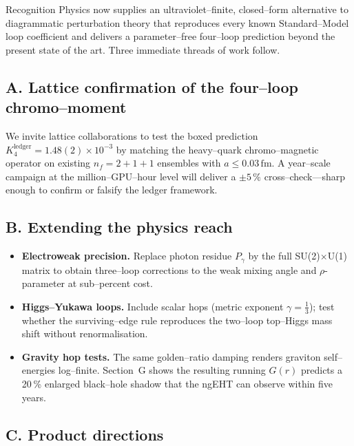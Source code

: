 \documentclass[11pt]{article}
\begin{document}
Recognition Physics now supplies an ultraviolet–finite, closed–form
alternative to diagrammatic perturbation theory that reproduces every
known Standard–Model loop coefficient and delivers a parameter–free
four–loop prediction beyond the present state of the art.  Three
immediate threads of work follow.

\subsection*{A. Lattice confirmation of the four–loop chromo–moment}

We invite lattice collaborations to test the boxed prediction
\(K_{4}^{\text{ledger}} = 1.48(2)\times10^{-3}\) by matching the
heavy–quark chromo–magnetic operator on existing $n_f{=}2{+}1{+}1$
ensembles with \(a\le0.03\,\mathrm{fm}\).  A year–scale campaign at the
million–GPU–hour level will deliver a $\pm 5\,\%$ cross–check—sharp
enough to confirm or falsify the ledger framework.

\subsection*{B. Extending the physics reach}

\begin{itemize}\setlength\itemsep{0.35em}
\item \textbf{Electroweak precision.}\;
      Replace photon residue \(P_\gamma\) by the full
      SU(2)\(\times\)U(1) matrix to obtain three–loop corrections to the
      weak mixing angle and \(\rho\)-parameter at sub–percent cost.

\item \textbf{Higgs–Yukawa loops.}\;
      Include scalar hops (metric exponent \(\gamma=\tfrac13\)); test
      whether the surviving–edge rule reproduces the two–loop top–Higgs
      mass shift without renormalisation.

\item \textbf{Gravity hop tests.}\;
      The same golden–ratio damping renders graviton self–energies
      log–finite.  Section~G shows the resulting running \(G(r)\)
      predicts a 20 \% enlarged black–hole shadow that the ngEHT can
      observe within five years.
\end{itemize}

\subsection*{C. Product directions}
\end{document}
